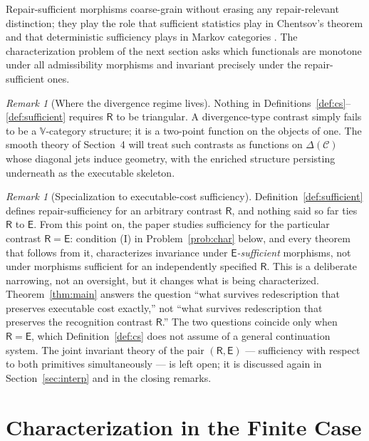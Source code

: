\documentclass[11pt]{article}
\theoremstyle{remark}
\newtheorem{remark}[theorem]{Remark}
\newcommand{\C}{\mathcal{C}}
\newcommand{\R}{\mathsf{R}}
\newcommand{\E}{\mathsf{E}}
\begin{document}
Repair-sufficient morphisms coarse-grain without erasing any
repair-relevant distinction; they play the role that sufficient
statistics play in Chentsov's theorem \cite{chentsov} and that
deterministic sufficiency plays in Markov categories \cite{fritz}.
The characterization problem of the next section asks which
functionals are monotone under all admissibility morphisms and
invariant precisely under the repair-sufficient ones.

\begin{remark}[Where the divergence regime lives]
Nothing in Definitions~\ref{def:cs}--\ref{def:sufficient} requires
$\R$ to be triangular. A divergence-type contrast simply fails to be
a $\mathbb{V}$-category structure; it is a two-point function on the
objects of one. The smooth theory of Section~4 will treat such
contrasts as functions on $\Delta(\C)$ whose diagonal jets induce
geometry, with the enriched structure persisting underneath as the
executable skeleton.
\end{remark}

\begin{remark}[Specialization to executable-cost sufficiency]\label{rem:specialize}
Definition~\ref{def:sufficient} defines repair-sufficiency for an
arbitrary contrast $\R$, and nothing said so far ties $\R$ to $\E$.
From this point on, the paper studies sufficiency for the particular
contrast $\R=\E$: condition (I) in Problem~\ref{prob:char} below, and
every theorem that follows from it, characterizes invariance under
\emph{$\E$-sufficient} morphisms, not under morphisms sufficient for
an independently specified $\R$. This is a deliberate narrowing, not
an oversight, but it changes what is being characterized.
Theorem~\ref{thm:main} answers the question ``what survives
redescription that preserves executable cost exactly,'' not ``what
survives redescription that preserves the recognition contrast
$\R$.'' The two questions coincide only when $\R=\E$, which
Definition~\ref{def:cs} does not assume of a general continuation
system. The joint invariant theory of the pair $(\R,\E)$ ---
sufficiency with respect to both primitives simultaneously --- is
left open; it is discussed again in Section~\ref{sec:interp} and in
the closing remarks.
\end{remark}

\section{Characterization in the Finite Case}\label{sec:char}
\end{document}
